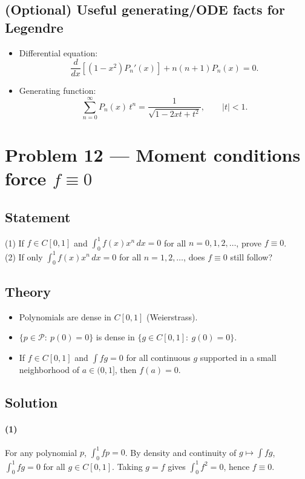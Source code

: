 \documentclass[12pt,a4paper]{article}
\theoremstyle{plain}
\theoremstyle{definition}
\theoremstyle{remark}
\theoremstyle{remark}
\begin{document}
\subsection*{(Optional) Useful generating/ODE facts for Legendre}
\begin{itemize}\setlength{\itemsep}{0.35em}
	\item Differential equation:
	\[
	\frac{d}{dx}\!\left[(1-x^2)P_n'(x)\right]+n(n+1)P_n(x)=0.
	\]
	\item Generating function:
	\[
	\sum_{n=0}^{\infty} P_n(x)\,t^n=\frac{1}{\sqrt{1-2xt+t^2}},\qquad |t|<1.
	\]
\end{itemize}

	
	\section*{Problem 12 — Moment conditions force $f\equiv0$}
	
	\subsection*{Statement}
	(1) If $f\in C[0,1]$ and $\int_0^1 f(x)x^n\,dx=0$ for all $n=0,1,2,\dots$, prove $f\equiv0$.\\
	(2) If only $\int_0^1 f(x)x^n\,dx=0$ for all $n=1,2,\dots$, does $f\equiv0$ still follow?
	
	\subsection*{Theory}
	\begin{itemize}\setlength{\itemsep}{0.5em}
		\item Polynomials are dense in $C[0,1]$ (Weierstrass).
		\item $\{p\in\mathcal P:\ p(0)=0\}$ is dense in $\{g\in C[0,1]:\ g(0)=0\}$.
		\item If $f\in C[0,1]$ and $\int f g=0$ for all continuous $g$ supported in a small neighborhood of $a\in(0,1]$, then $f(a)=0$.
	\end{itemize}
	
	\subsection*{Solution}
	\paragraph{(1)} For any polynomial $p$, $\int_0^1 f p=0$. By density and continuity of $g\mapsto\int f g$,
	$\int_0^1 f g=0$ for all $g\in C[0,1]$. Taking $g=f$ gives $\int_0^1 f^2=0$, hence $f\equiv0$.
	
\end{document}

